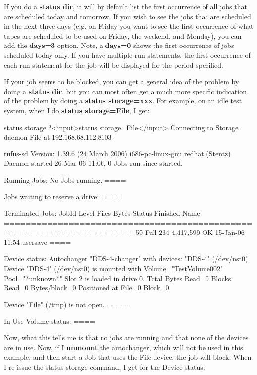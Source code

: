 \begin{description}
   If you do a {\bf status dir}, it will by default list the first
   occurrence of all jobs that are scheduled today and tomorrow.  If you
   wish to see the jobs that are scheduled in the next three days (e.g.  on
   Friday you want to see the first occurrence of what tapes are scheduled
   to be used on Friday, the weekend, and Monday), you can add the {\bf
   days=3} option.  Note, a {\bf days=0} shows the first occurrence of jobs
   scheduled today only.  If you have multiple run statements, the first
   occurrence of each run statement for the job will be displayed for the
   period specified.

   If your job seems to be blocked, you can get a general idea of the
   problem by doing a {\bf status dir}, but you can most often get a
   much more specific indication of the problem by doing a
   {\bf status storage=xxx}.  For example, on an idle test system, when
   I do {\bf status storage=File}, I get:

\begin{bconsole}{status storage}
*<input>status storage=File</input>
Connecting to Storage daemon File at 192.168.68.112:8103

rufus-sd Version: 1.39.6 (24 March 2006) i686-pc-linux-gnu redhat (Stentz)
Daemon started 26-Mar-06 11:06, 0 Jobs run since started.

Running Jobs:
No Jobs running.
====

Jobs waiting to reserve a drive:
====

Terminated Jobs:
 JobId  Level   Files          Bytes Status   Finished        Name
======================================================================
    59  Full        234      4,417,599 OK       15-Jan-06 11:54 usersave
====

Device status:
Autochanger "DDS-4-changer" with devices:
   "DDS-4" (/dev/nst0)
Device "DDS-4" (/dev/nst0) is mounted with Volume="TestVolume002"
Pool="*unknown*"
    Slot 2 is loaded in drive 0.
    Total Bytes Read=0 Blocks Read=0 Bytes/block=0
    Positioned at File=0 Block=0

Device "File" (/tmp) is not open.
====

In Use Volume status:
====
\end{bconsole}

Now, what this tells me is that no jobs are running and that none of
the devices are in use.  Now, if I {\bf unmount} the autochanger, which
will not be used in this example, and then start a Job that uses the
File device, the job will block.  When I re-issue the status storage
command, I get for the Device status:


\end{description}
